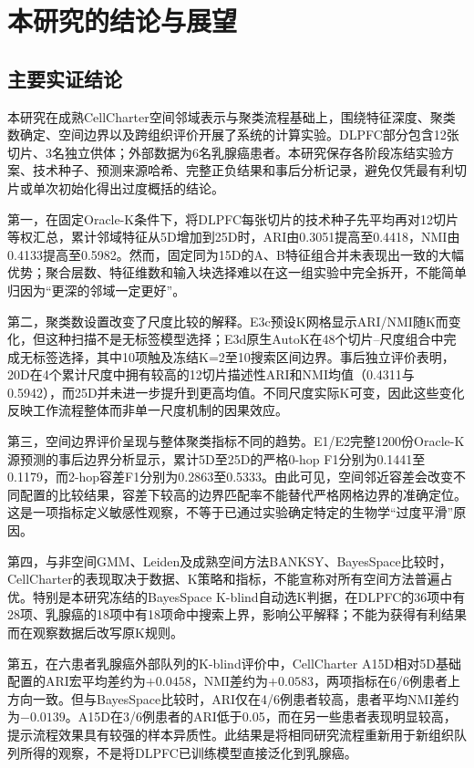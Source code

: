 \section{本研究的结论与展望}
\label{sec:cc-conclusion-module-v1}

\subsection{主要实证结论}
本研究在成熟CellCharter空间邻域表示与聚类流程基础上，围绕特征深度、聚类数确定、空间边界以及跨组织评价开展了系统的计算实验。DLPFC部分包含12张切片、3名独立供体；外部数据为6名乳腺癌患者。本研究保存各阶段冻结实验方案、技术种子、预测来源哈希、完整正负结果和事后分析记录，避免仅凭最有利切片或单次初始化得出过度概括的结论。

第一，在固定Oracle-K条件下，将DLPFC每张切片的技术种子先平均再对12切片等权汇总，累计邻域特征从5D增加到25D时，ARI由0.3051提高至0.4418，NMI由0.4133提高至0.5982。然而，固定同为15D的A、B特征组合并未表现出一致的大幅优势；聚合层数、特征维数和输入块选择难以在这一组实验中完全拆开，不能简单归因为“更深的邻域一定更好”。

第二，聚类数设置改变了尺度比较的解释。E3c预设K网格显示ARI/NMI随K而变化，但这种扫描不是无标签模型选择；E3d原生AutoK在48个切片--尺度组合中完成无标签选择，其中10项触及冻结K=2至10搜索区间边界。事后独立评价表明，20D在4个累计尺度中拥有较高的12切片描述性ARI和NMI均值（0.4311与0.5942），而25D并未进一步提升到更高均值。不同尺度实际K可变，因此这些变化反映工作流程整体而非单一尺度机制的因果效应。

第三，空间边界评价呈现与整体聚类指标不同的趋势。E1/E2完整1200份Oracle-K源预测的事后边界分析显示，累计5D至25D的严格0-hop F1分别为0.1441至0.1179，而2-hop容差F1分别为0.2863至0.5333。由此可见，空间邻近容差会改变不同配置的比较结果，容差下较高的边界匹配率不能替代严格网格边界的准确定位。这是一项指标定义敏感性观察，不等于已通过实验确定特定的生物学“过度平滑”原因。

第四，与非空间GMM、Leiden及成熟空间方法BANKSY、BayesSpace比较时，CellCharter的表现取决于数据、K策略和指标，不能宣称对所有空间方法普遍占优。特别是本研究冻结的BayesSpace K-blind自动选K判据，在DLPFC的36项中有28项、乳腺癌的18项中有18项命中搜索上界，影响公平解释；不能为获得有利结果而在观察数据后改写原K规则。

第五，在六患者乳腺癌外部队列的K-blind评价中，CellCharter A15D相对5D基础配置的ARI宏平均差约为$+0.0458$，NMI差约为$+0.0583$，两项指标在6/6例患者上方向一致。但与BayesSpace比较时，ARI仅在4/6例患者较高，患者平均NMI差约为$-0.0139$。A15D在3/6例患者的ARI低于0.05，而在另一些患者表现明显较高，提示流程效果具有较强的样本异质性。此结果是将相同研究流程重新用于新组织队列所得的观察，不是将DLPFC已训练模型直接泛化到乳腺癌。

